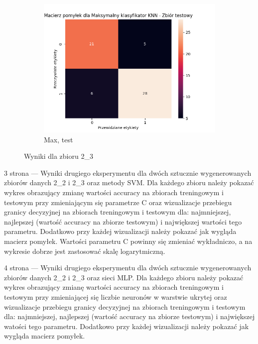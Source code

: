 \documentclass[12pt]{article}
\newcommand*{\subfigwidth}{0.15\textwidth}
\begin{document}
\begin{figure}[H]
\begin{subfigure}[t]{\subfigwidth}
        \includegraphics[width=\linewidth]{img/exp_2/knn/2_3/max/test_matrix.png}
        \caption{Max, test}
    \end{subfigure} 
    
    \caption{Wyniki dla zbioru 2\_3}
\end{figure}


\clearpage

3 strona --- Wyniki drugiego eksperymentu dla dwóch sztucznie wygenerowanych zbiorów danych 2\_2 i 2\_3 oraz metody SVM. Dla każdego zbioru należy pokazać wykres obrazujący zmianę wartości accuracy na zbiorach treningowym i testowym przy zmieniającym się parametrze C oraz wizualizacje przebiegu granicy decyzyjnej na zbiorach treningowym i testowym dla: najmniejszej, najlepszej (wartość accuracy na zbiorze testowym) i największej wartości tego parametru. Dodatkowo przy każdej wizualizacji należy pokazać jak wygląda macierz pomyłek. Wartości parametru C powinny się zmieniać wykładniczo, a na wykresie dobrze jest zastosować skalę logarytmiczną. 

\clearpage

4 strona --- Wyniki drugiego eksperymentu dla dwóch sztucznie wygenerowanych zbiorów danych 2\_2 i 2\_3 oraz sieci MLP. Dla każdego zbioru należy pokazać wykres obrazujący zmianę wartości accuracy na zbiorach treningowym i testowym przy zmieniającej się liczbie neuronów w warstwie ukrytej oraz wizualizacje przebiegu granicy decyzyjnej na zbiorach treningowym i testowym dla: najmniejszej, najlepszej (wartość accuracy na zbiorze testowym) i największej watości tego parametru. Dodatkowo przy każdej wizualizacji należy pokazać jak wygląda macierz pomyłek.
\end{document}
